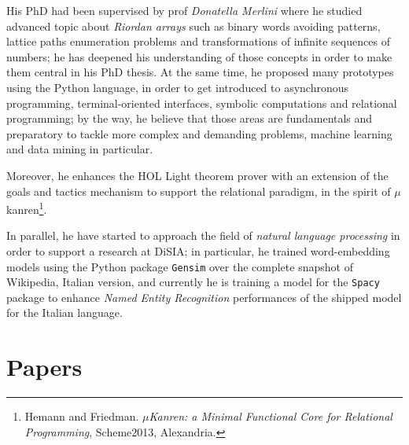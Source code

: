 \documentclass[a4paper]{article} %
\begin{document}
    His PhD had been supervised by prof \textit{Donatella Merlini} where he
    studied advanced topic about \textit{Riordan arrays} such as binary words
    avoiding patterns, lattice paths enumeration problems and transformations
    of infinite sequences of numbers; he has deepened his understanding of
    those concepts in order to make them central in his PhD thesis. At the same
    time, he proposed many prototypes using the Python language, in order to
    get introduced to asynchronous programming, terminal-oriented interfaces,
    symbolic computations and relational programming; by the way, he believe
    that those areas are fundamentals and preparatory to tackle more complex
    and demanding problems, machine learning and data mining in particular.

    Moreover, he enhances the HOL
    Light theorem prover with an extension of the goals and tactics mechanism
    to support the relational paradigm, in the spirit of
    $\mu$kanren\footnote{Hemann and Friedman. \textit{$\mu$Kanren: a Minimal Functional
    Core for Relational Programming}, Scheme2013, Alexandria.}.
	
	In parallel, he have started to approach the field of \emph{natural language processing}
	in order to support a research at DiSIA; in particular, he trained word-embedding models
	using the Python package \texttt{Gensim} over the complete snapshot of Wikipedia, Italian
	version, and currently he is training a model for the \texttt{Spacy} package to
	enhance \emph{Named Entity Recognition} performances of the shipped model for the
	Italian language.

    \section{Papers}
\end{document}
